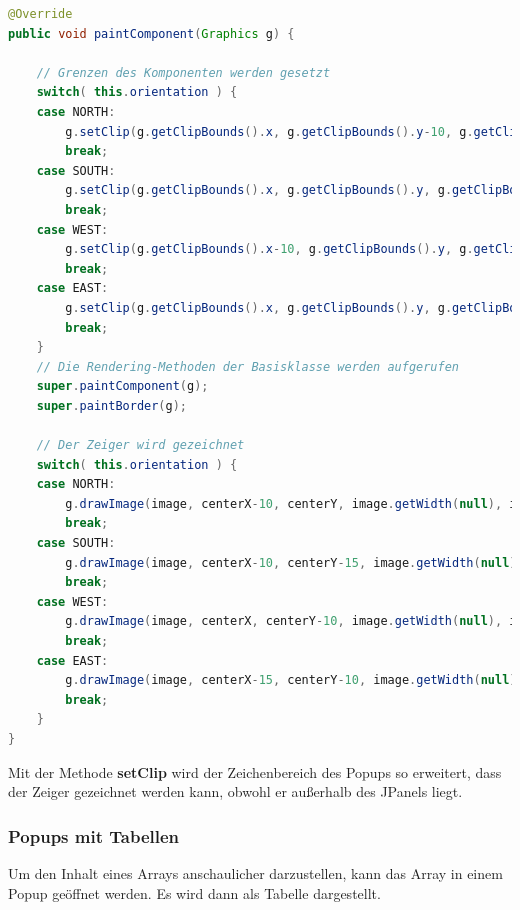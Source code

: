 \begin{lstlisting}[language=JAVA]
@Override
public void paintComponent(Graphics g) {
        
    // Grenzen des Komponenten werden gesetzt
    switch( this.orientation ) {
    case NORTH:
    	g.setClip(g.getClipBounds().x, g.getClipBounds().y-10, g.getClipBounds().width, g.getClipBounds().height+10);
    	break;
    case SOUTH:
    	g.setClip(g.getClipBounds().x, g.getClipBounds().y, g.getClipBounds().width+10, g.getClipBounds().height+10);
    	break;
    case WEST:
    	g.setClip(g.getClipBounds().x-10, g.getClipBounds().y, g.getClipBounds().width+10, g.getClipBounds().height);
    	break;
    case EAST:
    	g.setClip(g.getClipBounds().x, g.getClipBounds().y, g.getClipBounds().width+10, g.getClipBounds().height);
    	break;
    }
    // Die Rendering-Methoden der Basisklasse werden aufgerufen
    super.paintComponent(g);
    super.paintBorder(g);
    	
    // Der Zeiger wird gezeichnet
    switch( this.orientation ) {
    case NORTH:
    	g.drawImage(image, centerX-10, centerY, image.getWidth(null), image.getHeight(null), this);
    	break;
    case SOUTH:
    	g.drawImage(image, centerX-10, centerY-15, image.getWidth(null), image.getHeight(null), this);
    	break;
    case WEST:
    	g.drawImage(image, centerX, centerY-10, image.getWidth(null), image.getHeight(null), this);
    	break;
    case EAST:
    	g.drawImage(image, centerX-15, centerY-10, image.getWidth(null), image.getHeight(null), this);
    	break;
    }
}
\end{lstlisting}

Mit der Methode \textbf{setClip} wird der Zeichenbereich des Popups so erweitert, dass der Zeiger gezeichnet werden kann, obwohl er außerhalb des JPanels liegt.

\subsubsection*{Popups mit Tabellen}
Um den Inhalt eines Arrays anschaulicher darzustellen, kann das Array in einem Popup geöffnet werden. Es wird dann als Tabelle dargestellt.

